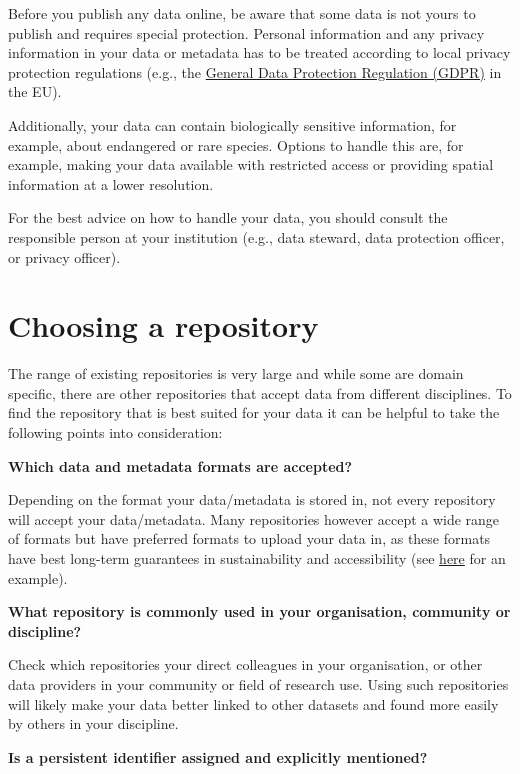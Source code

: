 \documentclass[
  oneside]{book}
\begin{document}
Before you publish any data online, be aware that some data is not yours to publish and requires special protection. Personal information and any privacy information in your data or metadata has to be treated according to local privacy protection regulations (e.g., the \href{https://commission.europa.eu/law/law-topic/data-protection/data-protection-eu_en}{General Data Protection Regulation (GDPR)} in the EU).

Additionally, your data can contain biologically sensitive information, for example, about endangered or rare species. Options to handle this are, for example, making your data available with restricted access or providing spatial information at a lower resolution.

For the best advice on how to handle your data, you should consult the responsible person at your institution (e.g., data steward, data protection officer, or privacy officer).

\section{Choosing a repository}\label{choosing-a-repository}

The range of existing repositories is very large and while some are domain specific, there are other repositories that accept data from different disciplines. To find the repository that is best suited for your data it can be helpful to take the following points into consideration:

\textbf{Which data and metadata formats are accepted?}

Depending on the format your data/metadata is stored in, not every repository will accept your data/metadata. Many repositories however accept a wide range of formats but have preferred formats to upload your data in, as these formats have best long-term guarantees in sustainability and accessibility (see \href{https://dans.knaw.nl/en/file-formats/}{here} for an example).

\textbf{What repository is commonly used in your organisation, community or discipline? }

Check which repositories your direct colleagues in your organisation, or other data providers in your community or field of research use. Using such repositories will likely make your data better linked to other datasets and found more easily by others in your discipline.

\textbf{Is a persistent identifier assigned and explicitly mentioned?}
\end{document}
